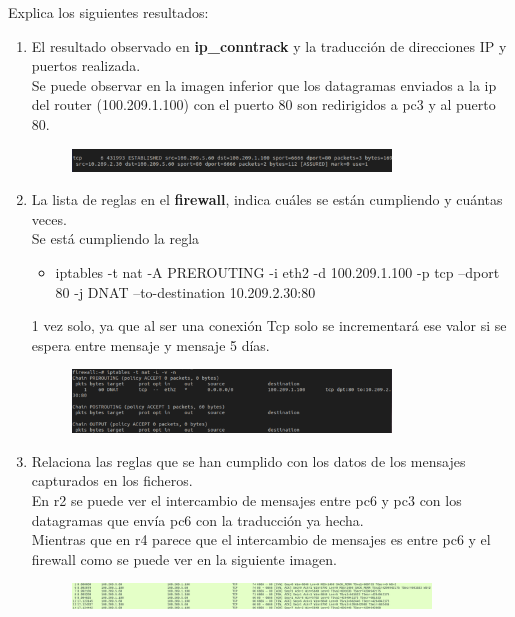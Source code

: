 \documentclass[12pt, a4paper]{report}
\begin{document}
Explica los siguientes resultados:
\begin{enumerate}
	\item El resultado observado en \textbf{ip\_conntrack }y la traducción de direcciones IP y puertos realizada.\\
		
	Se puede observar en la imagen inferior que los datagramas enviados a la ip del router (100.209.1.100) con el puerto 80 son redirigidos a pc3 y al puerto 80.
	\begin{figure}[h]
		\centering
		\includegraphics[width=0.8\textwidth]{ej2.2.1_1}
	\end{figure}
	\item La lista de reglas en el \textbf{firewall}, indica cuáles se están cumpliendo y cuántas veces.\\
	
	Se está cumpliendo la regla
	\begin{center}
		\begin{itemize}
			\item iptables -t nat -A PREROUTING -i eth2 -d 100.209.1.100 -p tcp --dport 80 -j DNAT --to-destination 10.209.2.30:80
		\end{itemize}
	\end{center}
	1 vez solo, ya que al ser una conexión Tcp solo se incrementará ese valor si se espera entre mensaje y mensaje 5 días.
	\begin{figure}[h]
		\centering
		\includegraphics[width=0.8\textwidth]{ej2.2.1_2}
	\end{figure}
	\item Relaciona las reglas que se han cumplido con los datos de los mensajes capturados en los ficheros.\\
	
	En r2 se puede ver el intercambio de mensajes entre pc6 y pc3 con los datagramas que envía pc6 con la traducción ya hecha.\\
	Mientras que en r4 parece que el intercambio de mensajes es entre pc6 y el firewall como se puede ver en la siguiente imagen.\\
	\begin{figure}[h]
		\centering
		\includegraphics[width=0.9\textwidth]{ej2.2.1_3}
	\end{figure}
\end{enumerate}
\end{document}
